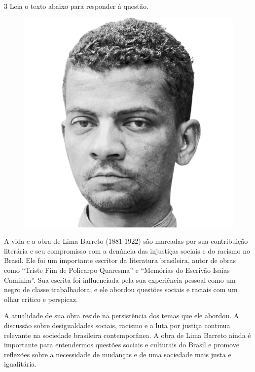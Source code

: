 \num{3} Leia o texto abaixo para responder à questão.

\begin{myquote}

\begin{figure}[H]
\centering
\includegraphics[scale=0.25]{./imgSAEB_7_POR/media/image43.png}
\end{figure} 


A vida e a obra de Lima Barreto (1881-1922) são marcadas por sua contribuição
literária e seu compromisso com a denúncia das injustiças sociais e do racismo
no Brasil. Ele foi um importante escritor da literatura brasileira, autor de
obras como ``Triste Fim de Policarpo Quaresma'' e ``Memórias do Escrivão
Isaías Caminha''. Sua escrita foi influenciada pela sua experiência pessoal
como um negro de classe trabalhadora, e ele abordou questões sociais e raciais
com um olhar crítico e perspicaz.

A atualidade de sua obra reside na persistência dos temas que ele abordou. 
A discussão sobre desigualdades sociais, racismo e a luta por justiça
continua relevante na sociedade brasileira contemporânea. A obra de Lima
Barreto ainda é importante para entendermos questões
sociais e culturais do Brasil e promove reflexões sobre a necessidade de
mudanças e de uma sociedade mais justa e igualitária. 


\end{myquote}

